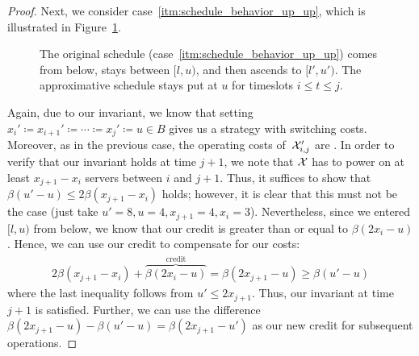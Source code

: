 \begin{proof}
Next, we consider case~\ref{itm:schedule_behavior_up_up}, which is illustrated in Figure~\ref{fig:schedule_behavior_up_up}.
\begin{figure}[ht]
\centering
	
\caption{The original schedule (case~\ref{itm:schedule_behavior_up_up}) comes from below, stays between $[l,u)$, and then ascends to $[l',u')$. The approximative schedule stays put at $u$ for timeslots $i\le t\le j$.}
\label{fig:schedule_behavior_up_up}
\end{figure}
Again, due to our invariant, we know that setting $x_i'\coloneqq x_{i+1}'\coloneqq\dotsb\coloneqq x_j'\coloneqq u\in B$ gives us a strategy with  switching costs. Moreover, as in the previous case, the operating costs of~$\mathcal{X}_{i,j}'$ are . In order to verify that our invariant holds at time $j+1$, we note that $\mathcal{X}$ has to power on at least $x_{j+1}-x_i$ servers between $i$ and $j+1$. Thus, it suffices to show that $\beta(u'-u)\le2\beta(x_{j+1}-x_i)$ holds; however, it is clear that this must not be the case (just take $u'=8,u=4,x_{j+1}=4,x_i=3$). Nevertheless, since we entered $[l,u)$ from below, we know that our credit is greater than or equal to $\beta(2x_i-u)$. Hence, we can use our credit to compensate for our costs:
\begin{align*}
	2\beta(x_{j+1}-x_i)+\overbrace{\beta(2x_i-u)}^{\text{credit}}=\beta(2x_{j+1}-u)\ge\beta(u'-u)
\end{align*}
where the last inequality follows from $u'\le2x_{j+1}$. Thus, our invariant at time $j+1$ is satisfied. Further, we can use the difference $\beta(2x_{j+1}-u)-\beta(u'-u)=\beta(2x_{j+1}-u')$ as our new credit for subsequent operations. 
	

\end{proof}
